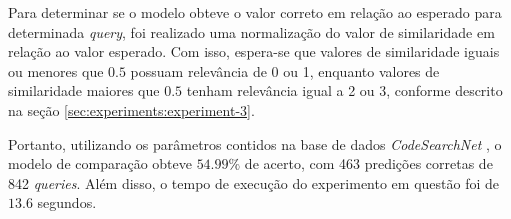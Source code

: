 Para determinar se o modelo obteve o valor correto em relação ao esperado para determinada \textit{query}, foi realizado uma normalização do valor de similaridade em relação ao valor esperado. Com isso, espera-se que valores de similaridade iguais ou menores que $0.5$ possuam relevância de 0 ou 1, enquanto valores de similaridade maiores que $0.5$ tenham relevância igual a 2 ou 3, conforme descrito na seção \ref{sec:experiments:experiment-3}.

Portanto, utilizando os parâmetros contidos na base de dados \textit{CodeSearchNet} \cite{Husain2019CodeSearchNetCE}, o modelo de comparação obteve $54.99\%$ de acerto, com 463 predições corretas de 842 \textit{queries}. Além disso, o tempo de execução do experimento em questão foi de $13.6$ segundos.
